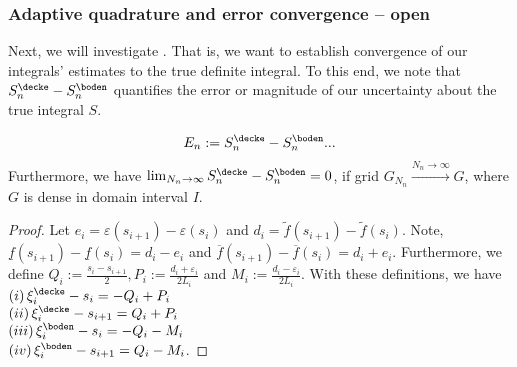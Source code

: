 \subsubsection{Adaptive quadrature and error convergence -- open} Next, we will investigate . That is, we want to establish convergence of our integrals' estimates to the true definite integral. To this end, we note that $S^\decke_n - S^\boden_n$ quantifies the error or magnitude of our uncertainty about the true integral $S$. 

\begin{thm}
\begin{align*}
		E_n := S^\decke_n - S^\boden_n 
& ...\\
\end{align*}
Furthermore, we have $\lim_{{N_n} \to \infty} S^\decke_n - S^\boden_n =0$, if grid $G_{N_n} \stackrel{{N_n} \to \infty}{\to} G$, where $G$ is dense in domain interval $I$. 

\begin{proof}

Let $e_i = \varepsilon(s_{i+1}) - \varepsilon(s_{i})$ and $d_i = \tilde f(s_{i+1}) - \tilde f(s_i)$.
Note, $\underline f(s_{i+1}) - \underline f(s_i) = d_i - e_i$ and $\overline f(s_{i+1}) - \overline f(s_i) = d_i + e_i$. Furthermore, we define $Q_i := \frac{s_i -s_{i+1}}{2}, P_i:= \frac{d_i + \varepsilon_i}{2 L_i}$ and $M_i := \frac{d_i - \varepsilon_i}{2 L_i}$.
With these definitions, we have \\
$(i)\, \xi^\decke_i - s_i = - Q_i + P_i $\\
%
$(ii) \,\xi^\decke_i - s_{i+1} =  Q_i + P_i $\\
%
$(iii) \,\xi^\boden_i - s_{i} =  -Q_i - M_i $\\
%
$(iv) \, \xi^\boden_i - s_{i+1} =  Q_i - M_i $.


\end{proof}
\end{thm}
